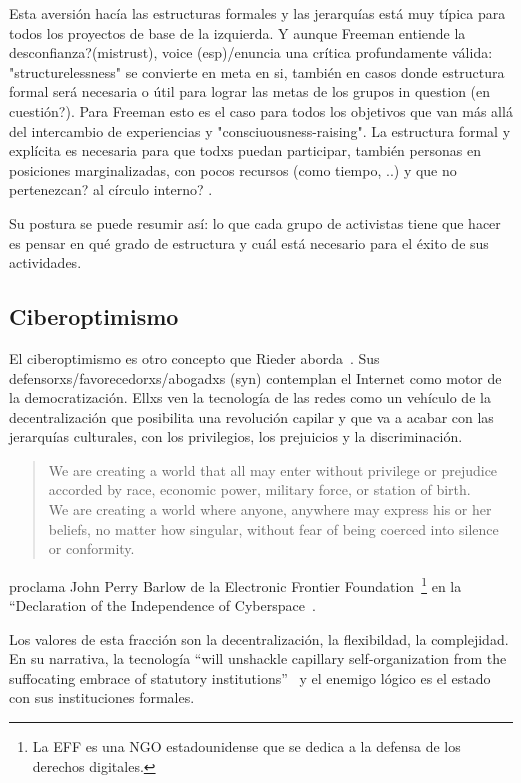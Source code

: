 Esta aversión hacía las estructuras formales y las jerarquías está muy típica para todos los proyectos de base de la izquierda.
Y aunque Freeman entiende la desconfianza?(mistrust), voice (esp)/enuncia una crítica profundamente válida:
"structurelessness" se convierte en meta en si, también en casos donde estructura formal será necesaria o útil para lograr las metas de los grupos in question (en cuestión?).
Para Freeman esto es el caso para todos los objetivos que van más allá del intercambio de experiencias y "consciuousness-raising".
La estructura formal y explícita es necesaria para que todxs puedan participar, también personas en posiciones marginalizadas, con pocos recursos (como tiempo, ..) y que no pertenezcan? al círculo interno? \autocite{Freeman1970}.

Su postura se puede resumir así: lo que cada grupo de activistas tiene que hacer es pensar en qué grado de estructura y cuál está necesario para el éxito de sus actividades.

\subsection{Ciberoptimismo}

El ciberoptimismo es otro concepto que Rieder aborda~\autocite{Rieder2012}.
Sus defensorxs/favorecedorxs/abogadxs (syn) contemplan el Internet como motor de la democratización.
Ellxs ven la tecnología de las redes como un vehículo de la decentralización que posibilita una revolución capilar y que va a acabar con las jerarquías culturales, con los privilegios, los prejuicios y la discriminación.

\begin{quotation}
We are creating a world that all may enter without privilege or prejudice accorded by race, economic power, military force, or station of birth.\\
We are creating a world where anyone, anywhere may express his or her beliefs, no matter how singular, without fear of being coerced into silence or conformity.
\end{quotation}
proclama John Perry Barlow de la Electronic Frontier Foundation~\footnote{La EFF es una NGO estadounidense que se dedica a la defensa de los derechos digitales.} en la ``Declaration of the Independence of Cyberspace~\autocite{Barlow1996}.

Los valores de esta fracción  son la decentralización, la flexibildad, la complejidad.
En su narrativa, la tecnología ``will unshackle capillary self-organization from the suffocating embrace of statutory institutions''~\autocite{Rieder2012} y el enemigo lógico es el estado con sus instituciones formales.


